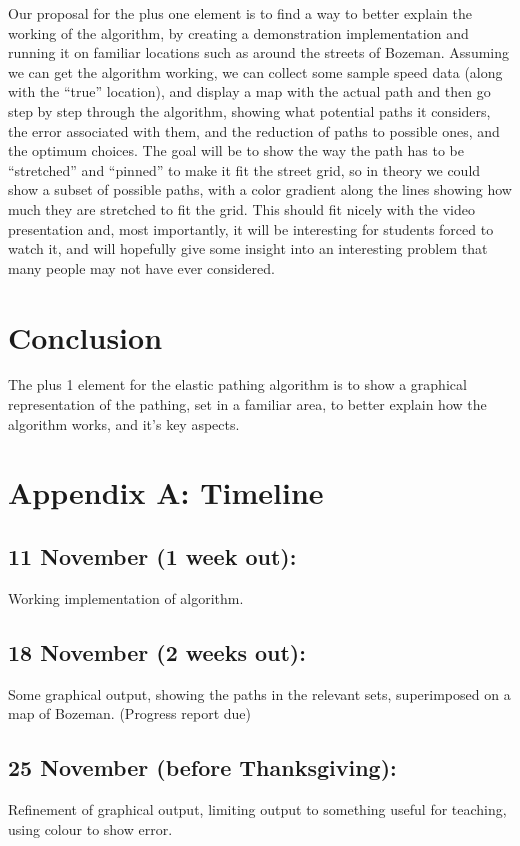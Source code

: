 \documentclass[11pt]{article}
\begin{document}
Our proposal for the plus one element is to find a way to better explain the working of the algorithm, by creating a demonstration implementation and running it on familiar locations such as around the streets of Bozeman.  Assuming we can get the algorithm working, we can collect some sample speed data (along with the “true” location), and display a map with the actual path and then go step by step through the algorithm, showing what potential paths it considers, the error associated with them, and the reduction of paths to possible ones, and the optimum choices.  The goal will be to show the way the path has to be “stretched” and “pinned” to make it fit the street grid, so in theory we could show a subset of possible paths, with a color gradient along the lines showing how much they are stretched to fit the grid.
\newline
This should fit nicely with the video presentation and, most importantly, it will be interesting for students forced to watch it, and will hopefully give some insight into an interesting problem that many people may not have ever considered.

\section{Conclusion}

The plus 1 element for the elastic pathing algorithm is to show a graphical representation of the pathing, set in a familiar area, to better explain how the algorithm works, and it’s key aspects.

\section{Appendix A:  Timeline}

\subsection{11 November (1 week out):}
Working implementation of algorithm.

\subsection{18 November (2 weeks out):}
Some graphical output, showing the paths in the relevant sets, superimposed on a map of Bozeman.  (Progress report due)

\subsection{25 November (before Thanksgiving):}
Refinement of graphical output, limiting output to something useful for teaching, using colour to show error.
\end{document}
